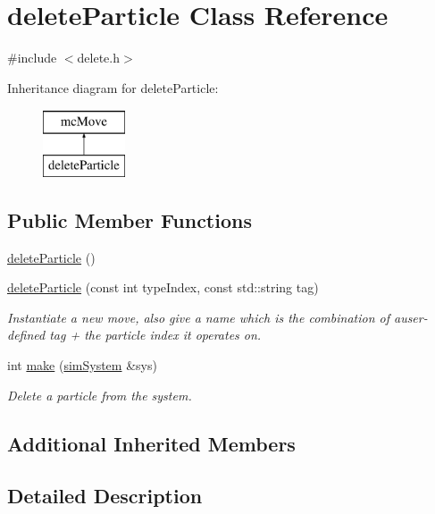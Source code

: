\hypertarget{classdelete_particle}{}\section{delete\+Particle Class Reference}
\label{classdelete_particle}


{\ttfamily \#include $<$delete.\+h$>$}

Inheritance diagram for delete\+Particle\+:\begin{figure}[H]
\begin{center}
\leavevmode
\includegraphics[height=2.000000cm]{classdelete_particle}
\end{center}
\end{figure}
\subsection*{Public Member Functions}
\begin{DoxyCompactItemize}
\item 
\hyperlink{classdelete_particle_a3b97ed18c7080043db26d2716c67dde0}{delete\+Particle} ()
\item 
\hyperlink{classdelete_particle_ae1a05ba703e5df3173384831fccc8698}{delete\+Particle} (const int type\+Index, const std\+::string tag)
\begin{DoxyCompactList}\small\item\em Instantiate a new move, also give a name which is the combination of auser-\/defined tag + the particle index it operates on. \end{DoxyCompactList}\item 
int \hyperlink{classdelete_particle_a14f86dd27a82f571caa12af04e22eb1f}{make} (\hyperlink{classsim_system}{sim\+System} \&sys)
\begin{DoxyCompactList}\small\item\em Delete a particle from the system. \end{DoxyCompactList}\end{DoxyCompactItemize}
\subsection*{Additional Inherited Members}


\subsection{Detailed Description}


